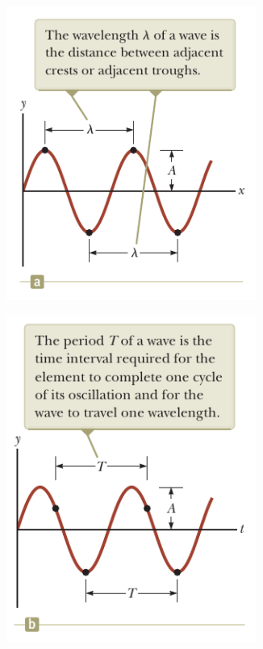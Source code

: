 \begin{figure}[h]
\centering
\begin{subfigure}{0.49\textwidth}
    \centering
    \includegraphics[width=0.9\textwidth]{images/oaw/fig16_8a.png}
\end{subfigure}
\begin{subfigure}{0.49\textwidth}
    \centering
    \includegraphics[width=0.9\textwidth]{images/oaw/fig16_8b.png}
\end{subfigure}
\end{figure}

